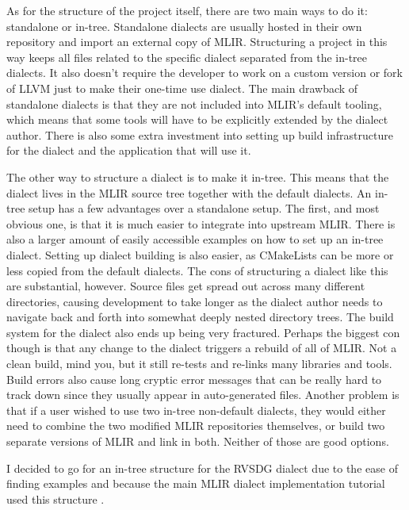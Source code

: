 As for the structure of the project itself, there are two main ways to do it: standalone or in-tree. Standalone dialects are usually hosted in their own repository and import an external copy of MLIR. Structuring a project in this way keeps all files related to the specific dialect separated from the in-tree dialects. It also doesn't require the developer to work on a custom version or fork of LLVM just to make their one-time use dialect. The main drawback of standalone dialects is that they are not included into MLIR's default tooling, which means that some tools will have to be explicitly extended by the dialect author. There is also some extra investment into setting up build infrastructure for the dialect and the application that will use it.

The other way to structure a dialect is to make it in-tree. This means that the dialect lives in the MLIR source tree together with the default dialects. An in-tree setup has a few advantages over a standalone setup. The first, and most obvious one, is that it is much easier to integrate into upstream MLIR. There is also a larger amount of easily accessible examples on how to set up an in-tree dialect. Setting up dialect building is also easier, as CMakeLists can be more or less copied from the default dialects. The cons of structuring a dialect like this are substantial, however. Source files get spread out across many different directories, causing development to take longer as the dialect author needs to navigate back and forth into somewhat deeply nested directory trees. The build system for the dialect also ends up being very fractured. Perhaps the biggest con though is that any change to the dialect triggers a rebuild of all of MLIR. Not a clean build, mind you, but it still re-tests and re-links many libraries and tools. Build errors also cause long cryptic error messages that can be really hard to track down since they usually appear in auto-generated files. Another problem is that if a user wished to use two in-tree non-default dialects, they would either need to combine the two modified MLIR repositories themselves, or build two separate versions of MLIR and link in both. Neither of those are good options.

I decided to go for an in-tree structure for the RVSDG dialect due to the ease of finding examples and because the main MLIR dialect implementation tutorial used this structure \cite{noauthor_creating_nodate}.

